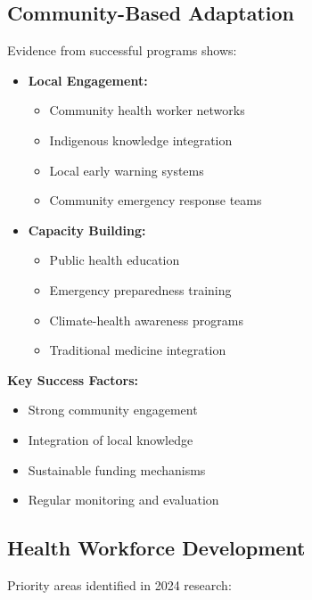 \subsection{Community-Based Adaptation}
Evidence from successful programs shows:

\begin{itemize}
    \item \textbf{Local Engagement:}
    \begin{itemize}
        \item Community health worker networks
        \item Indigenous knowledge integration
        \item Local early warning systems
        \item Community emergency response teams
    \end{itemize}
    
    \item \textbf{Capacity Building:}
    \begin{itemize}
        \item Public health education
        \item Emergency preparedness training
        \item Climate-health awareness programs
        \item Traditional medicine integration
    \end{itemize}
\end{itemize}

\begin{keymessage}
\textbf{Key Success Factors:}
\begin{itemize}
    \item Strong community engagement
    \item Integration of local knowledge
    \item Sustainable funding mechanisms
    \item Regular monitoring and evaluation
\end{itemize}
\end{keymessage}

\subsection{Health Workforce Development}
Priority areas identified in 2024 research:

